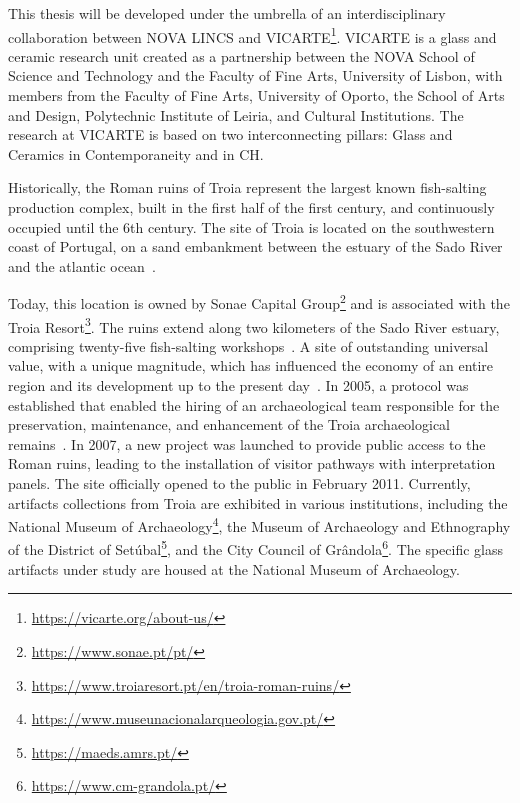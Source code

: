 This thesis will be developed under the umbrella of an interdisciplinary collaboration between NOVA LINCS and \gls{VICARTE}\footnote{\url{https://vicarte.org/about-us/}}.
\gls{VICARTE} is a glass and ceramic research unit created as a partnership between the NOVA School of Science and Technology and the Faculty of Fine Arts, University of Lisbon, with members from the Faculty of Fine Arts, University of Oporto, the School of Arts and Design, Polytechnic Institute of Leiria, and Cultural Institutions.
The research at \gls{VICARTE} is based on two interconnecting pillars: Glass and Ceramics in Contemporaneity and in \gls{CH}. 

Historically, the Roman ruins of Troia represent the largest known fish-salting production complex, built in the first half of the first century, and continuously occupied until the 6th century. 
The site of Troia is located on the southwestern coast of Portugal, on a sand embankment between the estuary of the Sado River and the atlantic ocean~\cite{pinto2018reassessment}.

Today, this location is owned by Sonae Capital Group\footnote{\url{https://www.sonae.pt/pt/}} and is associated with the Troia Resort\footnote{\url{https://www.troiaresort.pt/en/troia-roman-ruins/}}.
The ruins extend along two kilometers of the Sado River estuary, comprising twenty-five fish-salting workshops~\cite{hocquet2015fish}.
A site of outstanding  universal value, with a unique magnitude, which has influenced the economy of an entire region and its development up to the present day~\cite{unesco_troia}.
In 2005, a protocol was established that enabled the hiring of an archaeological team responsible for the preservation, maintenance, and enhancement of the Troia archaeological remains~\cite{pinto2014ruinas}. In 2007,
a new project was launched to provide public access to the Roman ruins, leading to the installation of visitor pathways with interpretation panels. The site officially opened to the public in February 2011. 
Currently, artifacts collections from Troia are exhibited in various institutions, including the National Museum of Archaeology\footnote{\url{https://www.museunacionalarqueologia.gov.pt/}}, the Museum of Archaeology and Ethnography of the District of Setúbal\footnote{\url{https://maeds.amrs.pt/}}, and the City Council of Grândola\footnote{\url{https://www.cm-grandola.pt/}}. The specific glass artifacts under study are housed at the National Museum of Archaeology.




